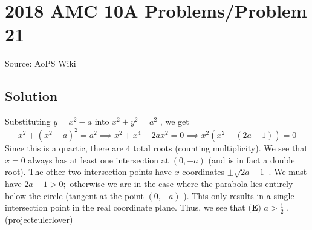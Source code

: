 \documentclass[12pt]{article}
\begin{document}
\section*{{2018 AMC 10A Problems/Problem 21}}
Source: AoPS Wiki

\subsection*{Solution}
Substituting $y=x^2-a$ into $x^2+y^2=a^2$ , we get \[x^2+(x^2-a)^2=a^2 \implies x^2+x^4-2ax^2=0 \implies x^2(x^2-(2a-1))=0\] Since this is a quartic, there are $4$ total roots (counting multiplicity). We see that $x=0$ always has at least one intersection at $(0,-a)$ (and is in fact a double root). The other two intersection points have $x$ coordinates $\pm\sqrt{2a-1}$ . We must have $2a-1> 0;$ otherwise we are in the case where the parabola lies entirely below the circle (tangent at the point $(0,-a)$ ). This only results in a single intersection point in the real coordinate plane. Thus, we see that $\boxed{\textbf{(E) }a>\frac12}$ . (projecteulerlover)
\end{document}
